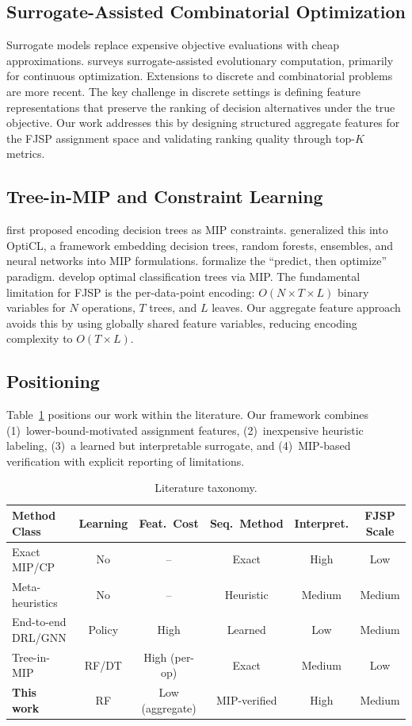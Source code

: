 \documentclass[12pt]{article}
\begin{document}
\subsection{Surrogate-Assisted Combinatorial Optimization}
Surrogate models replace expensive objective evaluations with cheap approximations. \citet{Jin2011} surveys surrogate-assisted evolutionary computation, primarily for continuous optimization. Extensions to discrete and combinatorial problems are more recent. The key challenge in discrete settings is defining feature representations that preserve the ranking of decision alternatives under the true objective. Our work addresses this by designing structured aggregate features for the FJSP assignment space and validating ranking quality through top-$K$ metrics.

\subsection{Tree-in-MIP and Constraint Learning}
\citet{Verwer2017} first proposed encoding decision trees as MIP constraints. \citet{Maragno2023} generalized this into OptiCL, a framework embedding decision trees, random forests, ensembles, and neural networks into MIP formulations. \citet{Elmachtoub2022} formalize the ``predict, then optimize'' paradigm. \citet{Bertsimas2017} develop optimal classification trees via MIP. The fundamental limitation for FJSP is the per-data-point encoding: $O(N \times T \times L)$ binary variables for $N$ operations, $T$ trees, and $L$ leaves. Our aggregate feature approach avoids this by using globally shared feature variables, reducing encoding complexity to $O(T \times L)$.

\subsection{Positioning}
Table~\ref{tab:taxonomy} positions our work within the literature. Our framework combines (1)~lower-bound-motivated assignment features, (2)~inexpensive heuristic labeling, (3)~a learned but interpretable surrogate, and (4)~MIP-based verification with explicit reporting of limitations.

\begin{table}[htbp]\centering\caption{Literature taxonomy.}\label{tab:taxonomy}
\begin{tabular}{lccccc}\toprule
Method Class & Learning & Feat.\ Cost & Seq.\ Method & Interpret. & FJSP Scale \\ \midrule
Exact MIP/CP & No & -- & Exact & High & Low \\
Meta-heuristics & No & -- & Heuristic & Medium & Medium \\
End-to-end DRL/GNN & Policy & High & Learned & Low & Medium \\
Tree-in-MIP & RF/DT & High (per-op) & Exact & Medium & Low \\
\textbf{This work} & RF & Low (aggregate) & MIP-verified & High & Medium \\ \bottomrule
\end{tabular}
\end{table}
\end{document}
